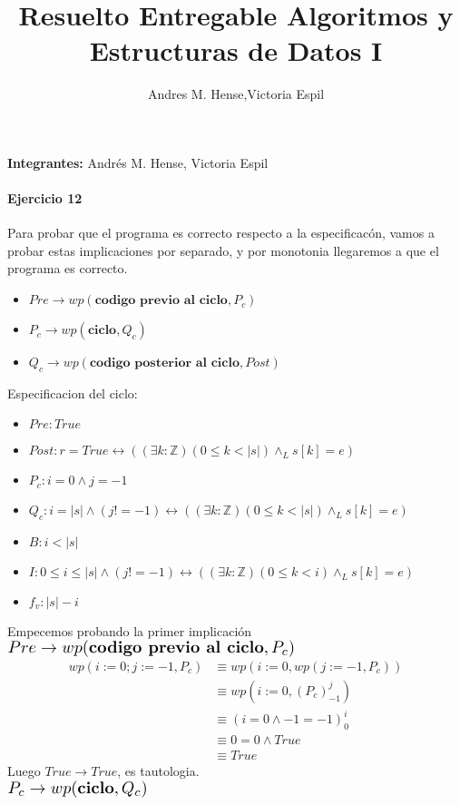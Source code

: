 \documentclass[a4paper]{article}
\title{Resuelto Entregable Algoritmos y Estructuras de Datos I}
\author{Andres M. Hense,Victoria Espil}
\date{}
\begin{document}




\begin{center}
\textbf{Integrantes:} Andrés M. Hense, Victoria Espil
\end{center}

\paragraph{Ejercicio 12}
Para probar que el programa es correcto respecto a la especificacón, vamos a probar estas implicaciones
 por separado, y por monotonia llegaremos a que el programa es correcto.\\
\begin{itemize}
\item $Pre \rightarrow wp(\textbf{codigo previo al ciclo},P_c)$
\item $P_c \rightarrow wp(\textbf{ciclo},Q_c)$
\item $Q_c \rightarrow wp(\textbf{codigo posterior al ciclo},Post)$
\end{itemize}
 Especificacion del ciclo:
	\begin{itemize}
		\item $Pre: True$
		\item $Post: r=True \leftrightarrow ((\exists k:\mathbb{Z})(0\leq k<|s|)\wedge_L s[k]=e) $
		\item $P_c: i=0\wedge j=-1$
		\item $Q_c: i=|s|\wedge (j!=-1)\leftrightarrow ((\exists k:\mathbb{Z})(0\leq k<|s|)\wedge_L s[k]=e)$
		\item $B: i<|s|$
		\item $I: 0\leq i\leq|s|\wedge (j!=-1)\leftrightarrow ((\exists k:\mathbb{Z})(0\leq k<i)\wedge_L s[k]=e) $
		\item $f_v:|s|-i$
	\end{itemize}
Empecemos probando la primer implicación\\
$\scalebox{1.3}{$Pre\rightarrow wp(\textbf{codigo previo al ciclo},P_c)$}$\medskip \\
\begin{align*}
wp(i:=0; j:=-1,P_c)&\equiv wp(i:=0,wp(j:=-1,P_c))\\
&\equiv wp(i:=0,(P_c)_{-1}^{j})\\
&\equiv (i=0\wedge -1=-1)_{0}^{i}\\
&\equiv 0=0\wedge True\\
&\equiv True
\end{align*}
Luego $True\rightarrow True$, es tautologia.\medskip\\
$\scalebox{1.3}{$P_c \rightarrow wp(\textbf{ciclo},Q_c)$}$\medskip \\
\end{document}

